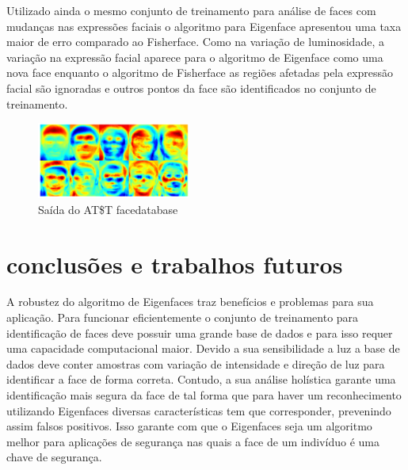 

                
    Utilizado ainda o mesmo conjunto de treinamento  para análise de faces com mudanças nas expressões faciais o algoritmo para Eigenface apresentou uma taxa maior de erro comparado ao Fisherface. Como na variação de luminosidade, a variação na expressão facial aparece para o algoritmo de Eigenface como uma nova face enquanto o algoritmo de Fisherface as regiões afetadas pela expressão facial são ignoradas e outros pontos da face são identificados no conjunto de treinamento.
    
\begin{figure}[H]
    \includegraphics[width=0.45\textwidth]{conteudo/Figura2}
    \caption{Saída do AT\$T facedatabase}
    \label{Figura2}
\end{figure}


\section*{conclusões e trabalhos futuros}

	A robustez do algoritmo de Eigenfaces traz benefícios e problemas para sua aplicação. Para funcionar eficientemente o conjunto de treinamento para identificação de faces deve possuir uma grande base de dados e para isso requer uma capacidade computacional maior. Devido a sua sensibilidade a luz a base de dados deve conter amostras com variação de intensidade e direção de luz para identificar a face de forma correta. Contudo, a sua análise holística garante uma identificação mais segura da face de tal forma que para haver um reconhecimento utilizando Eigenfaces diversas características tem que corresponder, prevenindo assim falsos positivos. Isso garante com que o Eigenfaces seja um algoritmo melhor para aplicações de segurança nas quais a face de um indivíduo é uma chave de segurança.



